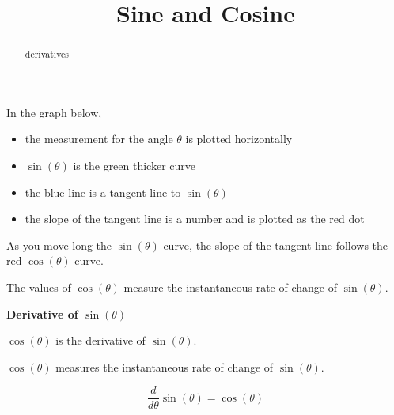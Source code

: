 \documentclass{ximera}
\title{Sine and Cosine}
\begin{document}
\begin{abstract}
derivatives
\end{abstract}
\maketitle








In the graph below, 

\begin{itemize}
\item the measurement for the angle $\theta$ is plotted horizontally
\item $\sin(\theta)$ is the green thicker curve
\item the blue line is a tangent line to $\sin(\theta)$
\item the slope of the tangent line is a number and is plotted as the red dot
\end{itemize}

As you move long the $\sin(\theta)$ curve, the slope of the tangent line follows the red $\cos(\theta)$ curve.








\begin{center}
\end{center}



The values of $\cos(\theta)$ measure the instantaneous rate of change of $\sin(\theta)$.



\begin{template}  \textbf{\textcolor{purple!65!blue}{Derivative of $\sin(\theta)$}}

\begin{center}
$\cos(\theta)$ is the derivative of $\sin(\theta)$.  

$\cos(\theta)$ measures the instantaneous rate of change of $\sin(\theta)$.  
\end{center}


\[
\frac{d}{d\theta} \sin(\theta) = \cos(\theta)
\]

\end{template}
\end{document}
